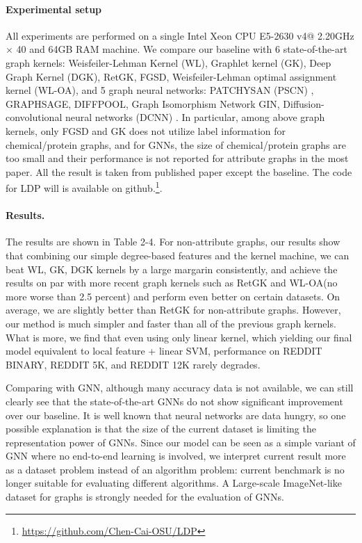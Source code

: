 \documentclass[11pt,onecolumn]{article}
\newcommand{\DOM}       {{LDP}\xspace}
\begin{document}
\paragraph{Experimental setup}
All experiments are performed on a single Intel Xeon CPU E5-2630 v4@ 2.20GHz $\times$ 40 and 64GB RAM machine. We compare our baseline with 6 state-of-the-art graph kernels: Weisfeiler-Lehman Kernel (WL)\cite{shervashidze2011weisfeiler}, Graphlet kernel (GK)\cite{shervashidze2009efficient}, Deep Graph Kernel (DGK)\cite{yanardag2015deep}, RetGK\cite{zhang2018retgk}, FGSD\cite{verma2017hunt}, Weisfeiler-Lehman optimal assignment kernel (WL-OA)\cite{kriege2016valid}, and 5 graph neural networks: PATCHYSAN (PSCN) \cite{niepert2016learning}, GRAPHSAGE\cite{hamilton2017inductive}, DIFFPOOL\cite{ying2018hierarchical}, Graph Isomorphism Network GIN\cite{xu2018powerful}, Diffusion-convolutional neural networks (DCNN) \cite{atwood2016diffusion}.
In particular, among above graph kernels, only FGSD and GK does not utilize label information for chemical/protein graphs, and for GNNs, the size of chemical/protein graphs are too small and their performance is not reported for attribute graphs in the most paper.
 All the result is taken from published paper except the baseline. The code for \DOM{} will is available on github.\footnote{\url{https://github.com/Chen-Cai-OSU/LDP}}.

\paragraph{Results.} 
The results are shown in Table 2-4.
For non-attribute graphs, our results show that combining our simple degree-based features and the kernel machine, we can beat WL, GK, DGK kernels by a large margarin consistently, and achieve the results on par with more recent graph kernels such as RetGK and WL-OA(no more worse than 2.5 percent) and perform even better on certain datasets. On average, we are slightly better than RetGK for non-attribute graphs. However, our method is much simpler and faster than all of the previous graph kernels.  What is more, we find that even using only linear kernel, which yielding our final model equivalent to local feature + linear SVM,  performance on REDDIT BINARY, REDDIT 5K, and REDDIT 12K rarely degrades. 

Comparing with GNN, although many accuracy data is not available, we can still clearly see that the state-of-the-art GNNs do not show significant improvement over our baseline. It is well known that neural networks are data hungry, so one possible explanation is that the size of the current dataset is limiting the representation power of GNNs.  Since our model can be seen as a simple variant of GNN where no end-to-end learning is involved, we interpret current result more as a dataset problem instead of an algorithm problem: current benchmark is no longer suitable for evaluating different algorithms.  A Large-scale ImageNet-like dataset for graphs is strongly needed for the evaluation of GNNs.
\end{document}
